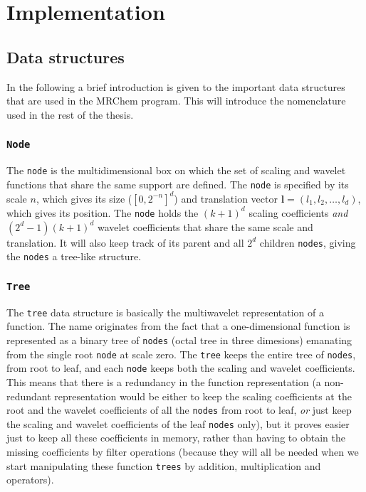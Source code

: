\chapter{Implementation}
\section{Data structures}
In the following a brief introduction is given to the important data structures
that are used in the MRChem program. This will introduce the nomenclature used 
in the rest of the thesis. 

\subsection*{\texttt{Node}}
The \texttt{node} is the multidimensional box on which the set of
scaling and wavelet functions that share the same support are defined. The 
\texttt{node} is specified by its scale $n$, which gives its size 
($[0,2^{-n}]^d$) and translation vector 
$\boldsymbol{l} = (l_1,l_2,\dots,l_d)$, which gives its position. 
The \texttt{node} holds the $(k+1)^d$ scaling coefficients \emph{and}
$(2^d-1)(k+1)^d$ wavelet coefficients that share the same scale and
translation. It will also keep track of its parent and all $2^d$ children
\texttt{nodes}, giving the \texttt{nodes} a tree-like structure.

\subsection*{\texttt{Tree}}
The \texttt{tree} data structure is basically the multiwavelet representation 
of a function. The name originates from the fact that a one-dimensional 
function is represented as a binary tree of \texttt{nodes} (octal tree in 
three dimesions) emanating from the single root \texttt{node} at scale zero.
The \texttt{tree} keeps the entire tree of \texttt{nodes}, from root to leaf,
and each \texttt{node} keeps both the scaling and wavelet coefficients. This
means that there is a redundancy in the function representation (a
non-redundant representation would be either to keep the scaling coefficients 
at the root and the wavelet coefficients of all the \texttt{nodes} from root to
leaf, \emph{or} just keep the scaling and wavelet coefficients of the leaf
\texttt{nodes} only), but it proves easier just to keep all these coefficients
in memory, rather than having to obtain the missing coefficients by filter
operations (because they will all be needed when we start manipulating these
function \texttt{trees} by addition, multiplication and operators).

